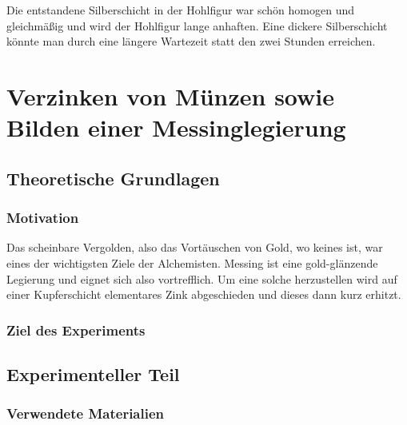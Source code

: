 \documentclass{article}
\begin{document}
      Die entstandene Silberschicht in der Hohlfigur war schön homogen und gleichmäßig und wird der Hohlfigur lange anhaften. Eine dickere Silberschicht könnte man durch eine längere Wartezeit statt den zwei Stunden erreichen. 
  
  \pagebreak
  
  \section{Verzinken von Münzen sowie Bilden einer Messinglegierung}
  
    \subsection{Theoretische Grundlagen}
      
      \subsubsection{Motivation}
        
        Das scheinbare Vergolden, also das Vortäuschen von Gold, wo keines ist, war eines der wichtigsten Ziele der Alchemisten. Messing ist eine gold-glänzende Legierung und eignet sich also vortrefflich. Um eine solche herzustellen wird auf einer Kupferschicht elementares Zink abgeschieden und dieses dann kurz erhitzt. 
        
      \subsubsection{Ziel des Experiments}
              
    
    \subsection{Experimenteller Teil}
    
      \subsubsection{Verwendete Materialien}
      
\end{document}

